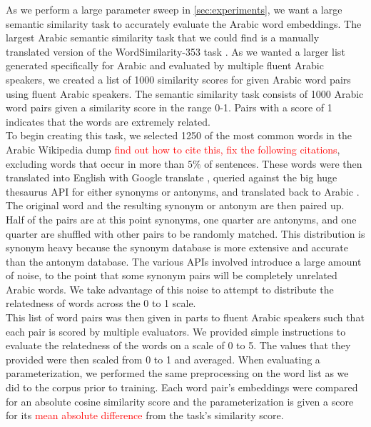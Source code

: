 As we perform a large parameter sweep in \ref{sec:experiments}, we want a large semantic similarity task to accurately evaluate the Arabic word embeddings. The largest Arabic semantic similarity task that we could find is a manually translated version of the WordSimilarity-353 task \cite{finkelstein:2001,hassan:2009}. As we wanted a larger list generated specifically for Arabic and evaluated by multiple fluent Arabic speakers, we created a list of 1000 similarity scores for given Arabic word pairs using fluent Arabic speakers. The semantic similarity task consists of 1000 Arabic word pairs given a similarity score in the range 0-1. Pairs with a score of 1 indicates that the words are extremely related.
\\
To begin creating this task, we selected 1250 of the most common words in the Arabic Wikipedia dump \textcolor{red}{find out how to cite this, fix the following citations}, excluding words that occur in more than $5\%$ of sentences. These words were then translated into English with Google translate \cite{google:online}, queried against the big huge thesaurus API for either synonyms or antonyms, and translated back to Arabic \cite{bhl:online}. The original word and the resulting synonym or antonym are then paired up. Half of the pairs are at this point synonyms, one quarter are antonyms, and one quarter are shuffled with other pairs to be randomly matched. This distribution is synonym heavy because the synonym database is more extensive and accurate than the antonym database. The various APIs involved introduce a large amount of noise, to the point that some synonym pairs will be completely unrelated Arabic words. We take advantage of this noise to attempt to distribute the relatedness of words across the 0 to 1 scale.
\\
This list of word pairs was then given in parts to fluent Arabic speakers such that each pair is scored by multiple evaluators. We provided simple instructions to evaluate the relatedness of the words on a scale of 0 to 5. The values that they provided were then scaled from 0 to 1 and averaged. When evaluating a parameterization, we performed the same preprocessing on the word list as we did to the corpus prior to training. Each word pair's embeddings were compared for an absolute cosine similarity score and the parameterization is given a score for its \textcolor{red}{mean absolute difference} from the task's similarity score.


